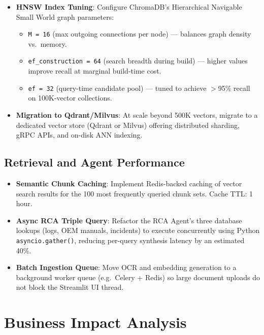 \documentclass[12pt,a4paper]{article}
\begin{document}
\begin{itemize}[leftmargin=1.5em]
  \item \textbf{HNSW Index Tuning}: Configure ChromaDB's Hierarchical Navigable Small World graph parameters:
    \begin{itemize}
      \item \texttt{M = 16} (max outgoing connections per node) --- balances graph density vs.\ memory.
      \item \texttt{ef\_construction = 64} (search breadth during build) --- higher values improve recall at marginal build-time cost.
      \item \texttt{ef = 32} (query-time candidate pool) --- tuned to achieve $>$95\% recall on 100K-vector collections.
    \end{itemize}
  \item \textbf{Migration to Qdrant/Milvus}: At scale beyond 500K vectors, migrate to a dedicated vector store (Qdrant or Milvus) offering distributed sharding, gRPC APIs, and on-disk ANN indexing.
\end{itemize}

\subsection{Retrieval and Agent Performance}

\begin{itemize}[leftmargin=1.5em]
  \item \textbf{Semantic Chunk Caching}: Implement Redis-backed caching of vector search results for the 100 most frequently queried chunk sets. Cache TTL: 1 hour.
  \item \textbf{Async RCA Triple Query}: Refactor the RCA Agent's three database lookups (logs, OEM manuals, incidents) to execute concurrently using Python \texttt{asyncio.gather()}, reducing per-query synthesis latency by an estimated 40\%.
  \item \textbf{Batch Ingestion Queue}: Move OCR and embedding generation to a background worker queue (e.g.\ Celery + Redis) so large document uploads do not block the Streamlit UI thread.
\end{itemize}

\section{Business Impact Analysis}
\end{document}
